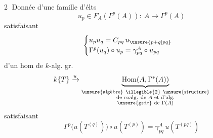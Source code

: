 \textcircled{2} Donnée d'une famille d'élts
\[
u_p\in F_A(\Gamma^p(A)):\ A\longrightarrow\Gamma^p(A)
\]
satisfaisant
\[
\begin{cases}
u_pu_q=C_{pq}\,u_{\unsure{p+q|pq}}\\
\Gamma^p(u_q)\circ u_p=\gamma^A_{pq}\circ u_{pq}
\end{cases}
\]
 d'un hom  de $k$-alg. gr. 
\[
k\{T\}\xrightarrow{u}
\underbrace{\operatorname{Hom}(A,\Gamma^*(A))}_{\substack{\unsure{\text{algèbre}}\ \illegible{2}\ \unsure{\text{structure}}\\
\text{de coalg. de }A\text{ et d'alg.}\\
\unsure{\text{grde}}\text{ de }\Gamma(A)}}
\]
satisfaisant
\[
\Gamma^p\bigl(u(T^{(q)})\bigr)\circ u(T^{(p)})
=\gamma^A_{pq}\,u(T^{(pq)})
\]

